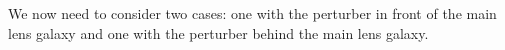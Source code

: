 We now need to consider two cases: one with the perturber in front of the main lens galaxy and one with the perturber behind the main lens galaxy.
